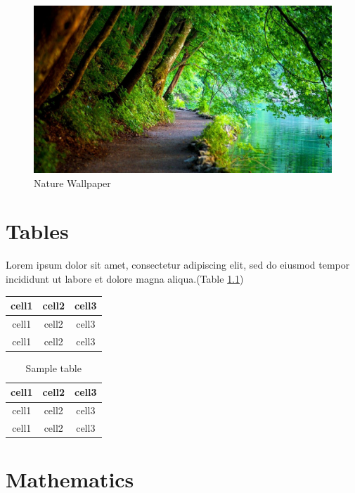 \documentclass[a4paper, 12pt]{report}
\begin{document}
\begin{figure}[h] %
	\includegraphics[width=\textwidth]{sample_img2}
	\caption{Nature Wallpaper}
	\label{fig:sample_img2}
	\centering
\end{figure}



\chapter{Tables}
Lorem ipsum dolor sit amet, consectetur adipiscing elit, sed do eiusmod tempor incididunt ut labore et dolore magna aliqua.(Table \ref{tab:sample_table})

\begin{tabular}{|c|c|c|}
\hline
cell1 & cell2 & cell3 \\
\hline
cell1 & cell2 & cell3 \\
\hline
cell1 & cell2 & cell3 \\
\hline
\end{tabular}

\begin{table}[h!]
	\centering
	\begin{tabular}{|c|c|c|}
	\hline
	cell1 & cell2 & cell3 \\
	\hline
	cell1 & cell2 & cell3 \\
	\hline
	cell1 & cell2 & cell3 \\
	\hline
	\end{tabular}
	\caption{Sample table}
	\label{tab:sample_table}
\end{table}



\chapter{Mathematics}
\end{document}
